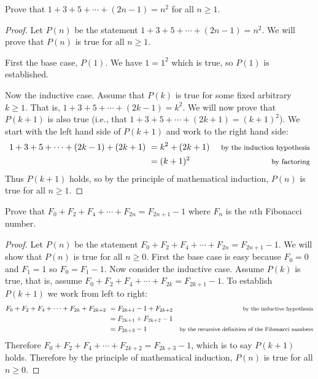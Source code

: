\begin{questions}
	
	

\question Prove that $1 + 3 + 5 + \cdots + (2n-1) = n^2$ for all $n \ge 1$.

	\begin{answer}
		\begin{proof}
		 Let $P(n)$ be the statement $1+3 +5 + \cdots + (2n-1) = n^2$.  We will prove that $P(n)$ is true for all $n \ge 1$.  
		 
		 First the base case, $P(1)$.  We have $ 1 = 1^2$ which is true, so $P(1)$ is established.
		 
		 Now the inductive case.  Assume that $P(k)$ is true for some fixed arbitrary $k \ge 1$.  That is, $1 + 3 + 5 + \cdots + (2k-1) = k^2$.  We will now prove that $P(k+1)$ is also true (i.e., that $1 + 3 + 5 + \cdots + (2k+1) = (k+1)^2$).  We start with the left hand side of $P(k+1)$ and work to the right hand side:
		 \begin{align*}
		  1 + 3 + 5 + \cdots + (2k-1) + (2k+1) ~ & = k^2 + (2k+1) & \mbox{ \footnotesize by the induction hypothesis}\\
		  & = (k+1)^2 & \mbox{ \footnotesize by factoring}
		 \end{align*}
		Thus $P(k+1)$ holds, so by the principle of mathematical induction, $P(n)$ is true for all $n \ge 1$.
		\end{proof}
	\end{answer}
	
	
	

\question Prove that $F_0 + F_2 + F_4 + \cdots + F_{2n} = F_{2n+1} - 1$ where $F_n$ is the $n$th Fibonacci number.

	\begin{answer}
		\begin{proof}
		 Let $P(n)$ be the statement $F_0 + F_2 + F_4 + \cdots + F_{2n} = F_{2n+1} - 1$.  We will show that $P(n)$ is true for all $n \ge 0$.  First the base case is easy because $F_0 = 0$ and $F_1 = 1$ so $F_0 = F_1 - 1$.  Now consider the inductive case.  Assume $P(k)$ is true, that is, assume $F_0 + F_2 + F_4 + \cdots + F_{2k} = F_{2k+1} - 1$.  To establish $P(k+1)$ we work from left to right:
		 \begin{align*}
		  F_0 + F_2 + F_4 + \cdots + F_{2k} + F_{2k+2} ~ & = F_{2k+1} - 1 + F_{2k+2} & \mbox{\footnotesize by the inductive hypothesis}\\
		  & = F_{2k+1} + F_{2k+2} - 1 & \\
		  & = F_{2k+3} - 1 & \mbox{\footnotesize by the recursive definition of the Fibonacci numbers}
		 \end{align*}
		Therefore $F_0 + F_2 + F_4 + \cdots + F_{2k+2} = F_{2k+3} - 1$, which is to say $P(k+1)$ holds.  Therefore by the principle of mathematical induction, $P(n)$ is true for all $n \ge 0$.
		\end{proof}
	\end{answer}
	

\end{questions}
